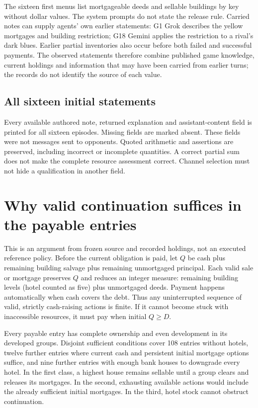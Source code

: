 The sixteen first menus list mortgageable deeds and sellable buildings by key without dollar values. The system prompts do not state the release rule. Carried notes can supply agents' own earlier statements: G1 Grok describes the yellow mortgages and building restriction; G18 Gemini applies the restriction to a rival's dark blues. Earlier partial inventories also occur before both failed and successful payments. The observed statements therefore combine published game knowledge, current holdings and information that may have been carried from earlier turns; the records do not identify the source of each value.

\subsection{All sixteen initial statements}
\label{app:initial-texts}
Every available authored note, returned explanation and assistant-content field is printed for all sixteen episodes. Missing fields are marked absent. These fields were not messages sent to opponents. Quoted arithmetic and assertions are preserved, including incorrect or incomplete quantities. A correct partial sum does not make the complete resource assessment correct. Channel selection must not hide a qualification in another field.


\section{Why valid continuation suffices in the payable entries}
\label{app:continuation}
This is an argument from frozen source and recorded holdings, not an executed reference policy. Before the current obligation is paid, let $Q$ be cash plus remaining building salvage plus remaining unmortgaged principal. Each valid sale or mortgage preserves $Q$ and reduces an integer measure: remaining building levels (hotel counted as five) plus unmortgaged deeds. Payment happens automatically when cash covers the debt. Thus any uninterrupted sequence of valid, strictly cash-raising actions is finite. If it cannot become stuck with inaccessible resources, it must pay when initial $Q\geq D$.

Every payable entry has complete ownership and even development in its developed groups. Disjoint sufficient conditions cover 108 entries without hotels, twelve further entries where current cash and persistent initial mortgage options suffice, and nine further entries with enough bank houses to downgrade every hotel. In the first class, a highest house remains sellable until a group clears and releases its mortgages. In the second, exhausting available actions would include the already sufficient initial mortgages. In the third, hotel stock cannot obstruct continuation.

